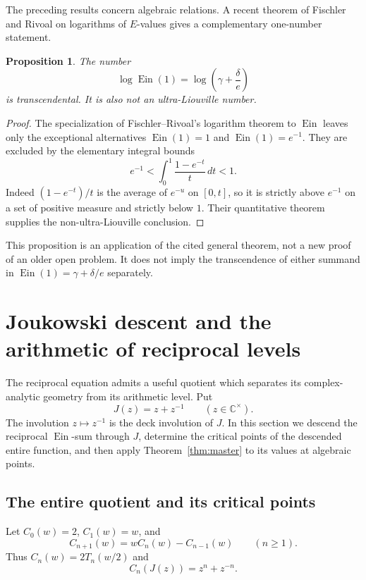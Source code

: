 \documentclass[11pt]{article}
\newtheorem{proposition}[theorem]{Proposition}
\theoremstyle{definition}
\theoremstyle{remark}
\newcommand{\C}{\mathbb C}
\newcommand{\Ein}{\operatorname{Ein}}
\begin{document}
The preceding results concern algebraic relations.  A recent theorem of
Fischler and Rivoal on logarithms of \(E\)-values \cite{FRlog} gives a complementary
one-number statement.

\begin{proposition}\label{prop:log-ein}
The number
\[
 \log\Ein(1)=\log\left(\gamma+\frac{\delta}{e}\right)
\]
is transcendental.  It is also not an ultra-Liouville number.
\end{proposition}

\begin{proof}
The specialization of Fischler--Rivoal's logarithm theorem \cite{FRlog} to \(\Ein\) leaves
only the exceptional alternatives \(\Ein(1)=1\) and \(\Ein(1)=e^{-1}\).
They are excluded by the elementary integral bounds
\[
 e^{-1}
 <\int_0^1\frac{1-e^{-t}}{t}\,dt
 <1.
\]
Indeed \((1-e^{-t})/t\) is the average of \(e^{-u}\) on \([0,t]\), so it is
strictly above \(e^{-1}\) on a set of positive measure and strictly below
\(1\).  Their quantitative theorem supplies the non-ultra-Liouville
conclusion.
\end{proof}

This proposition is an application of the cited general theorem, not a new
proof of an older open problem.  It does not imply the transcendence of either
summand in \(\Ein(1)=\gamma+\delta/e\) separately.

\section{Joukowski descent and the arithmetic of reciprocal levels}
\label{sec:joukowski-descent}

The reciprocal equation admits a useful quotient which separates its
complex-analytic geometry from its arithmetic level.  Put
\[
 J(z)=z+z^{-1}\qquad(z\in\C^\times).
\]
The involution $z\mapsto z^{-1}$ is the deck involution of $J$.  In this
section we descend the reciprocal $\Ein$-sum through $J$, determine the
critical points of the descended entire function, and then apply
Theorem~\ref{thm:master} to its values at algebraic points.

\subsection{The entire quotient and its critical points}

Let $C_0(w)=2$, $C_1(w)=w$, and
\[
 C_{n+1}(w)=wC_n(w)-C_{n-1}(w)\qquad(n\geq1).
\]
Thus $C_n(w)=2T_n(w/2)$ and
\begin{equation}\label{eq:joukowski-chebyshev}
 C_n(J(z))=z^n+z^{-n}.
\end{equation}
\end{document}
